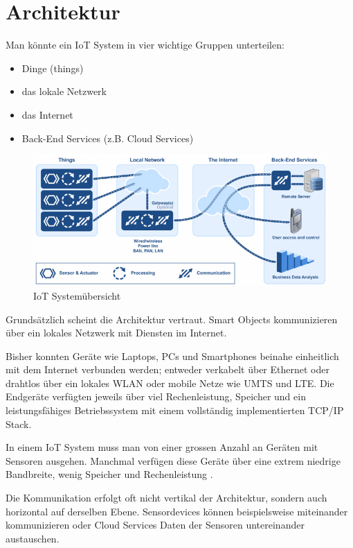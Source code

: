 \section{Architektur}
Man könnte ein IoT System in vier wichtige Gruppen unterteilen: \cite{IoTNetworks}
\begin{itemize}
\item Dinge (things)
\item das lokale Netzwerk
\item das Internet
\item Back-End Services (z.B. Cloud Services)
\end{itemize}
\begin{figure}[H]
\centering
\includegraphics[scale=0.8]{images/iot_system_overview_by_micrium.png}
\caption{IoT Systemübersicht\cite{IoTOverview}}
\end{figure}
Grundsätzlich scheint die Architektur vertraut. Smart Objects kommunizieren über ein lokales Netzwerk mit Diensten im Internet.

Bisher konnten Geräte wie Laptops, PCs und Smartphones beinahe einheitlich mit dem Internet verbunden werden; entweder verkabelt über Ethernet oder drahtlos über ein lokales WLAN oder mobile Netze wie UMTS und LTE. Die Endgeräte verfügten jeweils über viel Rechenleistung, Speicher und ein leistungsfähiges Betriebssystem mit einem vollständig implementierten TCP/IP Stack. 

In einem IoT System muss man von einer grossen Anzahl an Geräten mit Sensoren ausgehen. Manchmal verfügen diese Geräte über eine extrem niedrige Bandbreite, wenig Speicher und Rechenleistung \cite{CiscoIoTArchitecture}.

Die Kommunikation erfolgt oft nicht vertikal der Architektur, sondern auch horizontal auf derselben Ebene. Sensordevices können beispielsweise miteinander kommunizieren oder Cloud Services Daten der Sensoren untereinander austauschen.
